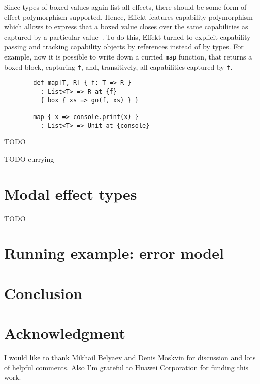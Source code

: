 \documentclass[conference]{IEEEtran}
\begin{document}
    Since types of boxed values again list all effects, there should be some form of effect polymorphism supported.
    Hence, Effekt features capability polymorphism which allows to express that a boxed value closes over the same capabilities as captured by a particular value~\cite{brachthauser2022effects}.
    To do this, Effekt turned to explicit capability passing and tracking capability objects by references instead of by types.
    For example, now it is possible to write down a curried \texttt{map} function, that returns a boxed block, capturing \texttt{f}, and, transitively, all capabilities captured by \texttt{f}.
    \begin{verbatim}
        def map[T, R] { f: T => R }
          : List<T> => R at {f}
          { box { xs => go(f, xs) } }

        map { x => console.print(x) }
          : List<T> => Unit at {console}
    \end{verbatim}









    TODO \cite{odersky2022scoped} %

    TODO currying %



    \section{Modal effect types} \label{sec:modal}

    TODO \cite{convent2020doo}\cite{tang2024modal}



    \section{Running example: error model}



    \section{Conclusion}



    \section*{Acknowledgment}

    I would like to thank Mikhail Belyaev and Denis Moskvin for discussion and lots of helpful comments.
    Also I'm grateful to Huawei Corporation for funding this work.



    
    
\end{document}
